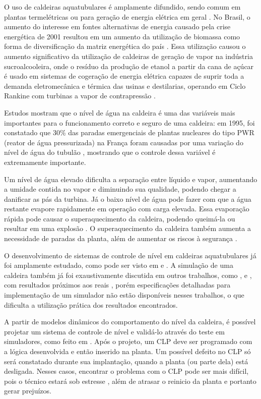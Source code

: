 O uso de caldeiras aquatubulares é amplamente difundido, sendo comum
em plantas termelétricas ou para geração de energia elétrica em geral
\cite{wikicaldeiras}. No Brasil, o aumento do interesse em fontes
alternativas de energia causado pela crise energética de 2001 resultou
em um aumento da utilização de biomassa como forma de diversificação
da matriz energética do país \cite{dantasusp}. Essa utilização causou
o aumento significativo da utilização de caldeiras de geração de vapor
na indústria sucroalcooleira, onde o resíduo da produção de etanol a
partir da cana de açúcar é usado em sistemas de cogeração de energia
elétrica capazes de suprir toda a demanda eletromecânica e térmica das
usinas e destilarias, operando em Ciclo Rankine com turbinas a vapor
de contrapressão \cite{leme2005}.

Estudos mostram que o nível de água na caldeira é uma das variáveis
mais importantes para o funcionamento correto e seguro de uma
caldeira: em 1995, foi constatado que 30\% das paradas emergenciais de
plantas nucleares do tipo PWR (reator de água pressurizada) na França
foram causadas por uma variação do nível de água do
tubulão , mostrando que o controle dessa variável
é extremamente importante.

Um nível de água elevado dificulta a separação entre líquido e vapor,
aumentando a umidade contida no vapor e diminuindo sua qualidade,
podendo chegar a danificar as pás da turbina. Já o baixo nível de água
pode fazer com que a água restante evapore rapidamente em operação com
carga elevada. Essa evaporação rápida pode causar o superaquecimento
da caldeira, podendo queimá-la ou resultar em uma
explosão \cite{yuan}. O superaquecimento da caldeira também aumenta a
necessidade de paradas da planta, além de aumentar os riscos à
segurança \cite{habib}.

O desenvolvimento de sistemas de controle de nível em caldeiras
aquatubulares já foi amplamente estudado, como pode ser visto
em  e .  A simulação de uma caldeira
também já foi exaustivamente discutida em outros trabalhos,
como ,  e ,
com resultados próximos aos reais \cite{astrom}, porém especificações
detalhadas para implementação de um simulador não estão disponíveis
nesses trabalhos, o que dificulta a utilização prática dos resultados
encontrados.

A partir de modelos dinâmicos do comportamento do nível da caldeira, é
possível projetar um sistema de controle de nível e validá-lo através
do teste em simuladores, como feito em . Após o
projeto, um CLP deve ser programado com a lógica desenvolvida e então
inserido na planta. Um possível defeito no CLP só será constatado
durante sua implantação, quando a planta (ou parte dela) está
desligada. Nesses casos, encontrar o problema com o CLP pode ser mais
difícil, pois o técnico estará sob estresse \cite{troubleshootplc},
além de atrasar o reinicio da planta e portanto gerar prejuízos.

